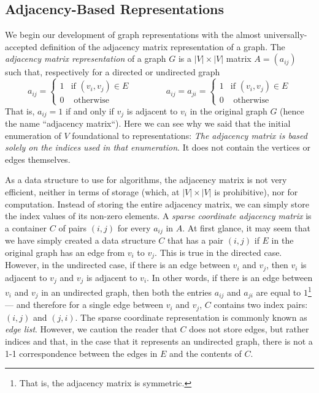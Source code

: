 \subsection{Adjacency-Based Representations}

We begin our development of graph representations
with the almost universally-accepted definition of the
adjacency matrix representation of a graph.
%
The \emph{adjacency matrix representation} of a graph $G$ is a $|V|\times |V|$ matrix $A = (a_{ij})$ such that,
respectively for a directed or undirected graph
\[
 a_{i j} = 
 \left\{
 \begin{array}{rl}
  1 & \textrm{if } (v_i, v_j) \in E \\
  0 & \textrm { otherwise }
 \end{array}
 \right.
 \qquad\qquad
 a_{i j} = a_{ji} =
 \left\{
 \begin{array}{rl}
  1 & \textrm{if } (v_i, v_j) \in E \\ 
  0 & \textrm { otherwise }
 \end{array}
 \right.
\]
That is, $a_{ij} = 1$ if and only if $v_j$ is adjacent to $v_i$ in the original graph $G$ (hence the name ``adjacency matrix``).
%
Here we can see why we said that the initial enumeration of $V$ foundational to representations:  \emph{The adjacency matrix is based solely on the indices used in that enumeration}.  It does not contain the vertices or edges themselves.

As a data structure to use for algorithms, the adjacency matrix is not very efficient, neither in terms of storage (which, at $|V|\times |V|$ is prohibitive), nor for computation. Instead of storing the entire
adjacency matrix, we can simply store the index values of its non-zero elements.  A \emph{sparse coordinate adjacency
matrix} is a container $C$ of pairs $(i, j)$ for every $a_{ij}$ in $A$.
%
At first glance, it may seem that we have simply created a data structure $C$ that has a pair $(i,j)$ if $E$ in the
original graph has an edge from $v_i$ to $v_j$.  This is true in the directed case.  However, in the undirected case, if there is an edge between $v_i$ and $v_j$, then $v_i$ is adjacent to $v_j$ and $v_j$ is adjacent to $v_i$.  In other words, if there is an edge between $v_i$ and  $v_j$ in an undirected graph, then both the entries $a_{ij}$ and $a_{ji}$ are equal to $1$\footnote{That is, the adjacency matrix is symmetric.} --- and therefore for a single edge between $v_i$ and $v_j$,  $C$ contains two index pairs: $(i, j)$  and $(j, i)$.   The sparse coordinate representation is commonly known as \emph{edge list}.  However, we caution the reader that $C$ does not store edges, but rather indices and that, in the case that it represents an undirected graph, there is not a 1-1 correspondence between the edges in $E$ and the contents of $C$.

